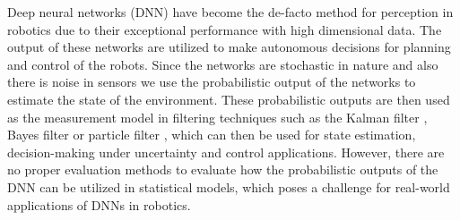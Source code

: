 Deep neural networks (DNN) have become the de-facto method for perception in robotics due to their exceptional performance with high dimensional data. The output of these networks are utilized to make autonomous decisions for planning and control of the robots. Since the networks are stochastic in nature and also there is noise in sensors we use the probabilistic output of the networks to estimate the state of the environment. These probabilistic outputs are then used as the measurement model in filtering techniques such as the Kalman filter \cite{9746732} \cite{revach2022kalmannet}, Bayes filter \cite{pankert2021deep} or particle filter \cite{karkus2018particle}, which can then be used for state estimation, decision-making under uncertainty and control applications. However, there are no proper evaluation methods to evaluate how the probabilistic outputs of the DNN can be utilized in statistical models, which poses a challenge for real-world applications of DNNs in robotics.

